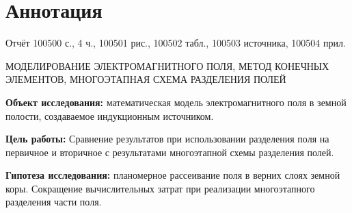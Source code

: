 \chapter*{Аннотация}

Отчёт 100500 с., 4 ч., 100501 рис., 100502 табл., 100503 источника, 100504 прил.

МОДЕЛИРОВАНИЕ ЭЛЕКТРОМАГНИТНОГО ПОЛЯ, МЕТОД КОНЕЧНЫХ ЭЛЕМЕНТОВ, МНОГОЭТАПНАЯ СХЕМА РАЗДЕЛЕНИЯ ПОЛЕЙ

\textbf{Объект исследования:}  математическая модель электромагнитного поля в земной полости, создаваемое индукционным источником.
 
\textbf{Цель работы:} 
Сравнение результатов при использовании разделения поля на первичное и вторичное с результатами многоэтапной схемы разделения полей.

\textbf{Гипотеза исследования:} планомерное рассеивание поля в верних слоях земной коры. Сокращение вычислительных затрат при реализации многоэтапного разделения части поля.